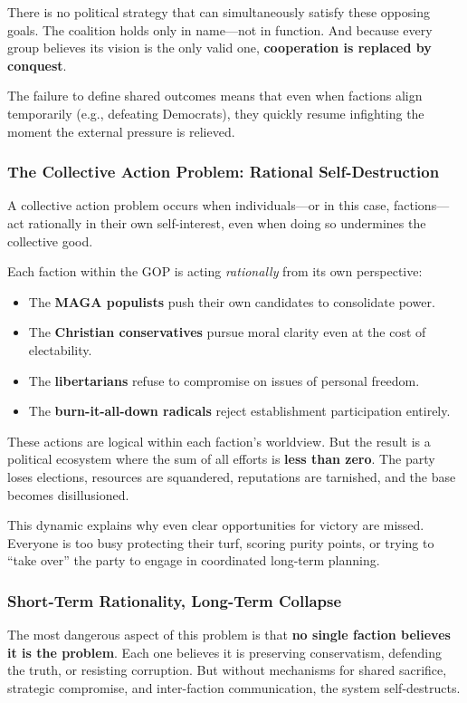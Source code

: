 There is no political strategy that can simultaneously satisfy these opposing goals. The coalition holds only in name—not in function. And because every group believes its vision is the only valid one, \textbf{cooperation is replaced by conquest}.

The failure to define shared outcomes means that even when factions align temporarily (e.g., defeating Democrats), they quickly resume infighting the moment the external pressure is relieved.

\subsubsection{The Collective Action Problem: Rational Self-Destruction}
A collective action problem occurs when individuals—or in this case, factions—act rationally in their own self-interest, even when doing so undermines the collective good.

Each faction within the GOP is acting \textit{rationally} from its own perspective:
\begin{itemize}
\item The \textbf{MAGA populists} push their own candidates to consolidate power.
\item The \textbf{Christian conservatives} pursue moral clarity even at the cost of electability.
\item The \textbf{libertarians} refuse to compromise on issues of personal freedom.
\item The \textbf{burn-it-all-down radicals} reject establishment participation entirely.
\end{itemize}

These actions are logical within each faction’s worldview. But the result is a political ecosystem where the sum of all efforts is \textbf{less than zero}. The party loses elections, resources are squandered, reputations are tarnished, and the base becomes disillusioned.

This dynamic explains why even clear opportunities for victory are missed. Everyone is too busy protecting their turf, scoring purity points, or trying to “take over” the party to engage in coordinated long-term planning.

\subsubsection{Short-Term Rationality, Long-Term Collapse}
The most dangerous aspect of this problem is that \textbf{no single faction believes it is the problem}. Each one believes it is preserving conservatism, defending the truth, or resisting corruption. But without mechanisms for shared sacrifice, strategic compromise, and inter-faction communication, the system self-destructs.

